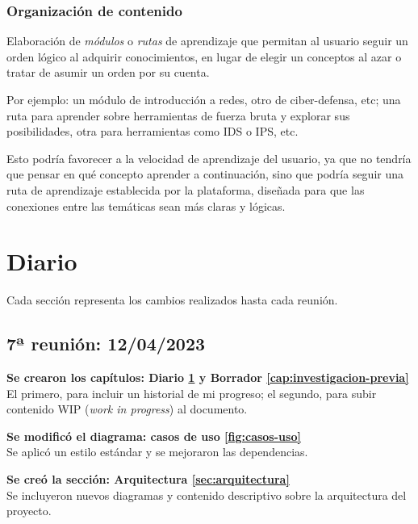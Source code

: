         \subsection{Organización de contenido}
        
            Elaboración de \textit{módulos} o \textit{rutas} de aprendizaje que permitan al usuario seguir un orden lógico al adquirir conocimientos, en lugar de elegir un conceptos al azar o tratar de asumir un orden por su cuenta.

            Por ejemplo: un módulo de introducción a redes, otro de ciber-defensa, etc; una ruta para aprender sobre herramientas de fuerza bruta y explorar sus posibilidades, otra para herramientas como IDS o IPS, etc.

            Esto podría favorecer a la velocidad de aprendizaje del usuario, ya que no tendría que pensar en qué concepto aprender a continuación, sino que podría seguir una ruta de aprendizaje establecida por la plataforma, diseñada para que las conexiones entre las temáticas sean más claras y lógicas.

            \cleardoublepage

            
            
\chapter{Diario}
    \label{cap:diario}

    Cada sección representa los cambios realizados hasta cada reunión.

    \section{7ª reunión: 12/04/2023}
    
        \textbf{Se crearon los capítulos: Diario \ref{cap:diario} y Borrador \ref{cap:investigacion-previa}} \\
        El primero, para incluir un historial de mi progreso; el segundo, para subir contenido WIP (\textit{work in progress}) al documento.
        
        \textbf{Se modificó el diagrama: casos de uso \ref{fig:casos-uso}} \\
        Se aplicó un estilo estándar y se mejoraron las dependencias.
        
        \textbf{Se creó la sección: Arquitectura \ref{sec:arquitectura}} \\
        Se incluyeron nuevos diagramas y contenido descriptivo sobre la arquitectura del proyecto.
        
